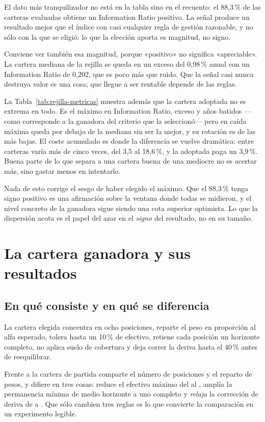El dato más tranquilizador no está en la tabla sino en el recuento: el 88,3\,\% de las
carteras evaluadas obtiene un Information Ratio positivo. La señal produce un resultado mejor que el
índice con casi cualquier regla de gestión razonable, y no sólo con la que se eligió: lo que la
elección aporta es magnitud, no signo.

Conviene ver también esa magnitud, porque «positivo» no significa «apreciable». La cartera mediana
de la rejilla se queda en un exceso del 0,98\,\% anual con un Information Ratio de 0,202, que es
poco más que ruido. Que la señal casi nunca destruya valor es una cosa; que llegue a ser rentable
depende de las reglas.

La Tabla~\ref{tab:rejilla-metricas} muestra además que la cartera adoptada no es extrema en todo. Es
el máximo en Information Ratio, exceso y años batidos ---como corresponde a la ganadora del criterio
que la seleccionó--- pero en caída máxima queda por debajo de la mediana sin ser la mejor, y su
rotación es de las más bajas. El coste acumulado es donde la diferencia se vuelve dramática: entre
carteras varía más de cinco veces, del 3,5 al 18,6\,\%, y la adoptada paga un 3,9\,\%. Buena parte de
lo que separa a una cartera buena de una mediocre no es acertar más, sino gastar menos en intentarlo.

Nada de esto corrige el sesgo de haber elegido el máximo. Que el 88,3\,\% tenga signo positivo es una
afirmación sobre la ventana donde todas se midieron, y el nivel concreto de la ganadora sigue siendo
una cota superior optimista. Lo que la dispersión acota es el papel del azar en el \emph{signo} del
resultado, no en su tamaño.

\section{La cartera ganadora y sus resultados}
\label{sec:cartera-ganadora}

\subsection{En qué consiste y en qué se diferencia}


La cartera elegida concentra en ocho posiciones, reparte el peso en proporción al alfa esperado,
tolera hasta un 10\,\% de efectivo, retiene cada posición un horizonte completo, no aplica suelo de
cobertura y deja correr la deriva hasta el 40\,\% antes de reequilibrar.

Frente a la cartera de partida comparte el número de posiciones y el reparto de pesos, y difiere en
tres cosas: reduce el efectivo máximo del \EfectivoModelo{} al \EfectivoCartera{}, amplía la
permanencia mínima de medio horizonte a uno completo y \emph{relaja} la corrección de deriva de
\DerivaModelo{} a \DerivaCartera{}. Que sólo cambien tres reglas es lo que convierte la comparación
en un experimento legible.

